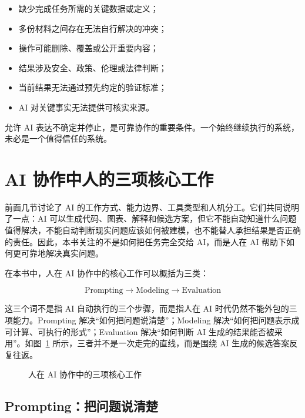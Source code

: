 \begin{itemize}
  \item 缺少完成任务所需的关键数据或定义；
  \item 多份材料之间存在无法自行解决的冲突；
  \item 操作可能删除、覆盖或公开重要内容；
  \item 结果涉及安全、政策、伦理或法律判断；
  \item 当前结果无法通过预先约定的验证标准；
  \item AI 对关键事实无法提供可核实来源。
\end{itemize}

允许 AI 表达不确定并停止，是可靠协作的重要条件。一个始终继续执行的系统，未必是一个值得信任的系统。

\section{AI 协作中人的三项核心工作}

前面几节讨论了 AI 的工作方式、能力边界、工具类型和人机分工。它们共同说明了一点：AI 可以生成代码、图表、解释和候选方案，但它不能自动知道什么问题值得解决，不能自动判断现实问题应该如何被建模，也不能替人承担结果是否正确的责任。因此，本书关注的不是如何把任务完全交给 AI，而是人在 AI 帮助下如何更可靠地解决真实问题。

在本书中，人在 AI 协作中的核心工作可以概括为三类：

\[
\text{Prompting} \rightarrow \text{Modeling} \rightarrow \text{Evaluation}
\]

这三个词不是指 AI 自动执行的三个步骤，而是指人在 AI 时代仍然不能外包的三项能力。Prompting 解决“如何把问题说清楚”；Modeling 解决“如何把问题表示成可计算、可执行的形式”；Evaluation 解决“如何判断 AI 生成的结果能否被采用”。如图~\ref{fig:ch01_cycle} 所示，三者并不是一次走完的直线，而是围绕 AI 生成的候选答案反复往返。

\begin{figure}[H]
  \centering
  \caption{人在 AI 协作中的三项核心工作}
  \label{fig:ch01_cycle}
\end{figure}

\subsection{Prompting：把问题说清楚}

